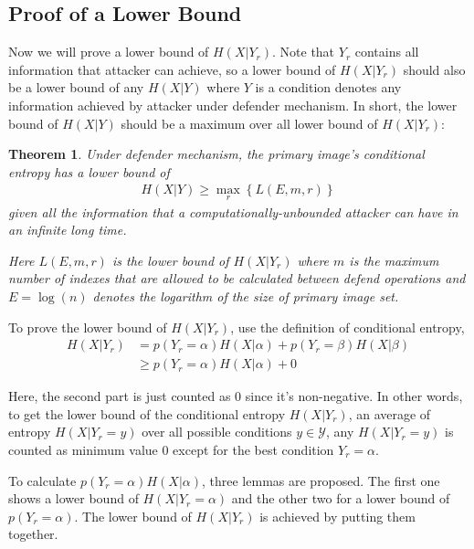 \documentclass[10pt, conference, compsocconf]{IEEEtran}
\newtheorem{mytheorem}{Theorem}
\begin{document}
    \subsection{Proof of a Lower Bound}
        Now we will prove a lower bound of $H(X | Y_r)$.
        Note that $Y_r$ contains all information that attacker can achieve,
        so a lower bound of $H(X | Y_r)$ should also be a lower
        bound of any $H(X | Y)$ where $Y$ is a condition denotes any
        information achieved by attacker under defender mechanism.
        In short, the lower bound of $H(X|Y)$ should be a maximum over
        all lower bound of $H(X | Y_r)$:
        \begin{mytheorem}\label{thm1}
            Under defender mechanism,
            the primary image's conditional entropy has a lower bound of
            \begin{align*}
                H(X | Y) \geq \max_{r} \left\{ L(E, m, r) \right\}
            \end{align*}
            given all the information
            that a computationally-unbounded attacker can
            have in an infinite long time.

            Here $L(E, m, r)$ is the lower bound of $H(X | Y_r)$
            where $m$ is
            the maximum number of indexes that are allowed to be calculated
            between defend operations and $E = \log(n)$ denotes the
            logarithm of the size of primary image set.
        \end{mytheorem}


        To prove the lower bound of $H(X | Y_r)$, use the definition of conditional entropy,
        \begin{align*}
            H(X|Y_r) &= p(Y_r = \alpha) H(X | \alpha) + p(Y_r = \beta) H(X | \beta)\\
                &\geq p(Y_r = \alpha) H(X | \alpha) + 0
        \end{align*}

        Here, the second part is just counted as $0$ since it's non-negative.
        In other words, to get the lower bound of the conditional entropy $H(X | Y_r)$,
        an average of entropy $H(X | Y_r = y)$ over all possible conditions $y \in \mathcal Y$,
        any $H(X | Y_r = y)$ is counted as minimum value $0$ except for the best condition
        $Y_r = \alpha$.

        To calculate $p(Y_r = \alpha) H(X | \alpha)$, three lemmas are proposed.
        The first one shows a lower bound of $H(X | Y_r = \alpha)$
        and the other two for a lower bound of $p(Y_r = \alpha)$.
        The lower bound of $H(X | Y_r)$ is achieved by putting
        them together.
\end{document}
